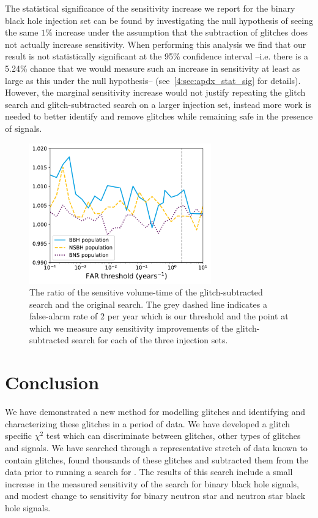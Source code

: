 The statistical significance of the sensitivity increase we report for the binary black hole injection set can be found by investigating the null hypothesis of seeing the same $1\%$ increase under the assumption that the subtraction of \scl{} glitches does not actually increase sensitivity. When performing this analysis we find that our result is not statistically significant at the 95\% confidence interval --i.e. there is a 5.24\% chance that we would measure such an increase in sensitivity at least as large as this under the null hypothesis-- (see~\ref{4:sec:apdx_stat_sig} for details). However, the marginal sensitivity increase would not justify repeating the \scl{} glitch search and glitch-subtracted \gw{} search on a larger injection set, instead more work is needed to better identify and remove \scl{} glitches while remaining safe in the presence of \gw{} signals.

\begin{figure}
     \centering
     \includegraphics[width=0.7\textwidth]{images/4_archenemy/Section4/4.1/allinj_vt_ratio_ArchEnemy_coinc.pdf}
     \caption{The ratio of the sensitive volume-time of the glitch-subtracted search and the original \gw{} search. The grey dashed line indicates a false-alarm rate of $2$ per year which is our threshold and the point at which we measure any sensitivity improvements of the glitch-subtracted search for each of the three \gw{} injection sets. }
     \label{4:fig:allinj_vt_ratio}
\end{figure}

\section{\label{4:sec:conclusion}Conclusion}

We have demonstrated a new method for modelling \scl{} glitches and identifying and characterizing these glitches in a period of \gw{} data. We have developed a \scl{} glitch specific $\chi^{2}$ test which can discriminate between \scl{} glitches, other types of glitches and \gw{} signals. We have searched through a representative stretch of \gw{} data known to contain \scl{} glitches, found thousands of these glitches and subtracted them from the \gw{} data prior to running a search for \gws{}. The results of this search include a small increase in the measured sensitivity of the \gw{} search for binary black hole \gw{} signals, and modest change to sensitivity for binary neutron star and neutron star black hole \gw{} signals.

